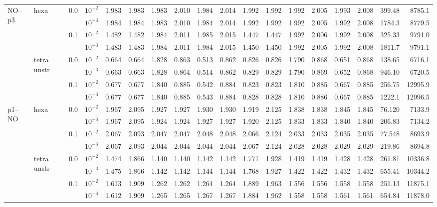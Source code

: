 \begin{longtable}{llclrrrrrrrrrrrrrr}
\multirow{8}{*}{NO--p3} & \multirow{4}{*}{hexa} & \multirow{2}{*}{0.0} & $10^{-2}$ & 1.983 & 1.983 & 1.983 & 2.010 & 1.984 & 2.014 & 1.992 & 1.992 & 1.992 & 2.005 & 1.993 & 2.008 & 399.48 & 8785.1 \\
& & & $10^{-3}$ & 1.984 & 1.984 & 1.983 & 2.010 & 1.984 & 2.014 & 1.992 & 1.992 & 1.992 & 2.005 & 1.992 & 2.008 & 1784.3 & 8779.5 \\\cline{3-18}
& & \multirow{2}{*}{0.1} & $10^{-2}$ & 1.482 & 1.482 & 1.984 & 2.011 & 1.985 & 2.015 & 1.447 & 1.447 & 1.992 & 2.006 & 1.992 & 2.008 & 325.33 & 9791.0 \\
& & & $10^{-3}$ & 1.483 & 1.483 & 1.984 & 2.011 & 1.984 & 2.015 & 1.450 & 1.450 & 1.992 & 2.005 & 1.992 & 2.008 & 1811.7 & 9791.1 \\\cline{2-18}
& \multirow{4}{*}{tetra unstr} & \multirow{2}{*}{0.0} & $10^{-2}$ & 0.664 & 0.664 & 1.828 & 0.863 & 0.513 & 0.862 & 0.826 & 0.826 & 1.790 & 0.868 & 0.651 & 0.868 & 138.65 & 6716.1 \\
& & & $10^{-3}$ & 0.663 & 0.663 & 1.828 & 0.864 & 0.514 & 0.862 & 0.829 & 0.829 & 1.790 & 0.869 & 0.652 & 0.868 & 946.10 & 6720.5 \\\cline{3-18}
& & \multirow{2}{*}{0.1} & $10^{-2}$ & 0.677 & 0.677 & 1.840 & 0.885 & 0.542 & 0.884 & 0.823 & 0.823 & 1.810 & 0.885 & 0.667 & 0.885 & 256.75 & 12995.9 \\
& & & $10^{-3}$ & 0.677 & 0.677 & 1.840 & 0.885 & 0.543 & 0.884 & 0.828 & 0.828 & 1.810 & 0.886 & 0.667 & 0.885 & 1222.1 & 12996.5 \\\hline

\multirow{8}{*}{p1--NO} & \multirow{4}{*}{hexa} & \multirow{2}{*}{0.0} & $10^{-2}$ & 1.967 & 2.095 & 1.927 & 1.927 & 1.930 & 1.930 & 1.919 & 2.125 & 1.838 & 1.838 & 1.845 & 1.845 & 76.120 & 7133.9 \\
& & & $10^{-3}$ & 1.967 & 2.095 & 1.924 & 1.924 & 1.927 & 1.927 & 1.920 & 2.125 & 1.833 & 1.833 & 1.840 & 1.840 & 206.83 & 7134.2 \\\cline{3-18}
& & \multirow{2}{*}{0.1} & $10^{-2}$ & 2.067 & 2.093 & 2.047 & 2.047 & 2.048 & 2.048 & 2.066 & 2.124 & 2.033 & 2.033 & 2.035 & 2.035 & 77.548 & 8693.9 \\
& & & $10^{-3}$ & 2.067 & 2.093 & 2.044 & 2.044 & 2.044 & 2.044 & 2.067 & 2.124 & 2.028 & 2.028 & 2.029 & 2.029 & 219.86 & 8694.8 \\\cline{2-18}
& \multirow{4}{*}{tetra unstr} & \multirow{2}{*}{0.0} & $10^{-2}$ & 1.474 & 1.866 & 1.140 & 1.140 & 1.142 & 1.142 & 1.771 & 1.928 & 1.419 & 1.419 & 1.428 & 1.428 & 261.81 & 10336.8 \\
& & & $10^{-3}$ & 1.475 & 1.866 & 1.142 & 1.142 & 1.144 & 1.144 & 1.768 & 1.927 & 1.422 & 1.422 & 1.432 & 1.432 & 655.41 & 10344.2 \\\cline{3-18}
& & \multirow{2}{*}{0.1} & $10^{-2}$ & 1.613 & 1.909 & 1.262 & 1.262 & 1.264 & 1.264 & 1.889 & 1.963 & 1.556 & 1.556 & 1.558 & 1.558 & 251.13 & 11875.1 \\
& & & $10^{-3}$ & 1.612 & 1.909 & 1.265 & 1.265 & 1.267 & 1.267 & 1.884 & 1.962 & 1.558 & 1.558 & 1.561 & 1.561 & 654.84 & 11878.0 \\\hline


\end{longtable}
